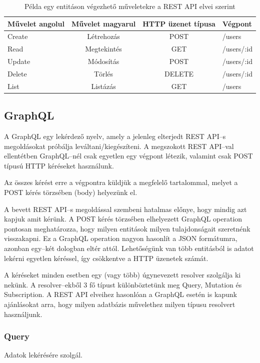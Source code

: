 \begin{table}[ht]
	\footnotesize
	\centering
	\begin{tabular}{ l c c l }
		\toprule
		Művelet angolul & Művelet magyarul & HTTP üzenet típusa & Végpont \\
		\midrule
		Create & Létrehozás & POST & /users \\
		Read & Megtekintés & GET & /users/:id \\
		Update & Módosítás  & POST & /users/:id \\
		Delete & Törlés  &  DELETE & /users/:id \\
		List & Listázás  & GET & /users \\
		\bottomrule
	\end{tabular}
	\caption{Példa egy entitáson végezhető műveletekre a REST API elvei szerint}
	\label{tab:RESTTable}
\end{table}

\subsection{GraphQL}

A GraphQL egy lekérdező nyelv, amely a jelenleg elterjedt REST API–s megoldásokat próbálja leváltani/kiegészíteni. A megszokott REST API–val ellentétben GraphQL–nél csak egyetlen egy végpont létezik, valamint csak POST típusú HTTP kéréseket használunk. 

Az összes kérést erre a végpontra küldjük a megfelelő tartalommal, melyet a POST kérés törzsében (body) helyezünk el.

A bevett REST API–s megoldással szembeni hatalmas előnye, hogy mindig azt kapjuk amit kérünk. A POST kérés törzsében elhelyezett GraphQL operation pontosan meghatározza, hogy milyen entitások milyen tulajdonságait szeretnénk visszakapni. Ez a GraphQL operation nagyon hasonlít a JSON formátumra, azonban egy–két dologban eltér attól. Lehetőségünk van több entitásból is adatot lekérni egyetlen kéréssel, így csökkentve a HTTP üzenetek számát.

A kéréseket minden esetben egy (vagy több) úgynevezett resolver szolgálja ki nekünk. 
A resolver–ekből 3 fő típust különböztetünk meg Query, Mutation és Subscription.
A REST API elveihez hasonlóan a GraphQL esetén is kapunk ajánlásokat arra, hogy milyen adatbázis művelethez milyen típusu resolvert használjunk.

\subsubsection{Query}
Adatok lekérésére szolgál.
  
